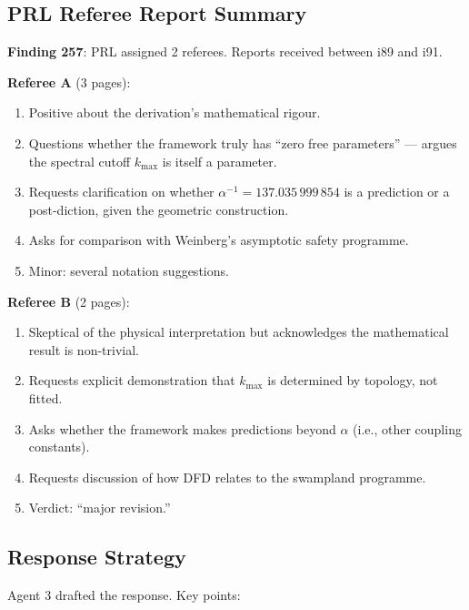 \documentclass[11pt,a4paper]{article}
\begin{document}
\subsection{PRL Referee Report Summary}

\textbf{Finding 257}: PRL assigned 2 referees. Reports received between i89 and i91.

\begin{tcolorbox}[colback=blue!5!white, colframe=dfdblue, title=\textbf{PRL Referee Reports --- Summary}]

\textbf{Referee A} (3 pages):
\begin{enumerate}[nosep]
\item Positive about the derivation's mathematical rigour.
\item Questions whether the framework truly has ``zero free parameters'' --- argues the spectral cutoff $k_{\max}$ is itself a parameter.
\item Requests clarification on whether $\alpha^{-1} = 137.035\,999\,854$ is a prediction or a post-diction, given the geometric construction.
\item Asks for comparison with Weinberg's asymptotic safety programme.
\item Minor: several notation suggestions.
\end{enumerate}

\textbf{Referee B} (2 pages):
\begin{enumerate}[nosep]
\item Skeptical of the physical interpretation but acknowledges the mathematical result is non-trivial.
\item Requests explicit demonstration that $k_{\max}$ is determined by topology, not fitted.
\item Asks whether the framework makes predictions beyond $\alpha$ (i.e., other coupling constants).
\item Requests discussion of how DFD relates to the swampland programme.
\item Verdict: ``major revision.''
\end{enumerate}
\end{tcolorbox}

\subsection{Response Strategy}

Agent 3 drafted the response. Key points:
\end{document}
